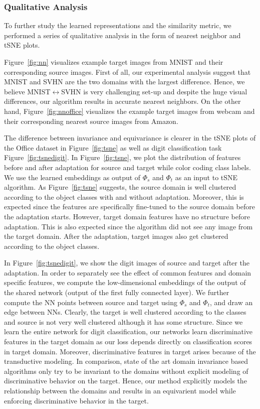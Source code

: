 \subsubsection{Qualitative Analysis}
To further study the learned representations and the similarity metric, we performed a series of qualitative analysis in the form of nearest neighbor and tSNE\cite{tsne} plots.


Figure~\ref{fig:nn} visualizes example target images from MNIST and their corresponding source images. First of all, our experimental analysis suggest that MNIST and SVHN are the two domains with the largest difference. Hence, we believe MNIST$\leftrightarrow$SVHN is very challenging set-up and despite the huge visual differences, our algorithm results in accurate nearest neighbors. On the other hand, Figure~\ref{fig:nnoffice} visualizes the example target images from webcam and their corresponding nearest source images from Amazon. 


The difference between invariance and equivariance is clearer in the tSNE plots of the Office dataset in Figure~\ref{fig:tsne} as well as digit classification task Figure~\ref{fig:tsnedigit}. In Figure~\ref{fig:tsne}, we plot the distribution of features before and after adaptation for source and target while color coding class labels. We use the learned embeddings as output of $\Phi_s$ and $\Phi_t$ as an input to tSNE algorithm\cite{tsne}. As Figure~\ref{fig:tsne} suggests, the source domain is well clustered according to the object classes with and without adaptation. Moreover, this is expected since the features are specifically fine-tuned to the source domain before the adaptation starts. However, target domain features have no structure before adaptation. This is also expected since the algorithm did not see any image from the target domain. After the adaptation, target images also get clustered according to the object classes. 




In Figure~\ref{fig:tsnedigit}, we show the digit images of source and target after the adaptation. In order to separately see the effect of common features and domain specific features, we compute the low-dimensional embeddings of the output of the shared network (output of the first fully connected layer). We further compute the NN points between source and target using $\Phi_s$ and $\Phi_t$, and draw an edge between NNs. Clearly, the target is well clustered according to the classes and source is not very well clustered although it has some structure. Since we learn the entire network for digit classification, our networks learn discriminative features in the target domain as our loss depends directly on classification scores in target domain. Moreover, discriminative features in target arises because of the transductive modeling. In comparison, state of the art domain invariance based algorithms only try to be invariant to the domains without explicit modeling of discriminative behavior on the target. Hence, our method explicitly models the relationship between the domains and results in an equivarient model while enforcing discriminative behavior in the target. 


